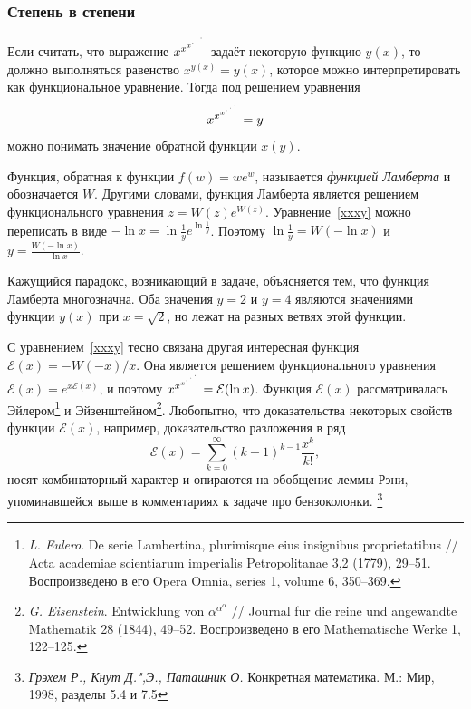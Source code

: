 \documentclass[twoside]{book}
\begin{document}
\subsubsection*{Степень в степени} %
Если считать, что выражение $x^{x^{ x^{{\cdot}^{\mkern2.5mu\cdot^{\mkern2.5mu\cdot}}}}}$ задаёт некоторую функцию $y(x)$, то должно выполняться равенство $x^{y(x)}=y(x)$, которое можно интерпретировать как функциональное уравнение.
Тогда под решением уравнения 
\begin{equation}
\label{xxxy}
x^{x^{ x^{{\cdot}^{\mkern2.5mu\cdot^{\mkern2.5mu\cdot}}}}}=y
\end{equation}
можно понимать значение обратной функции $x(y).$

Функция,  обратная к функции $f(w)=we^w$, называется \emph{функцией Ламберта} и обозначается $W$.
Другими словами,  функция Ламберта является решением функционального уравнения $z=W(z)e^{W(z)}$.
Уравнение~\eqref{xxxy} можно переписать в виде $-\ln x=\ln\frac{1}{y }e^{\ln\frac{1}{y }}$.
Поэтому $\ln\frac{1}{y }=W(-\ln x)$
и
$y=\frac{W(-\ln x)}{ -\ln x}$.

Кажущийся парадокс, возникающий в задаче, объясняется тем, что  функция Ламберта многозначна.
Оба значения $y=2$ и $y=4$ являются значениями функции $y(x)$ при $x=\sqrt{2}$, но лежат на разных ветвях этой функции. 

С уравнением~\eqref{xxxy} тесно связана другая интересная функция
$\mathcal{E}(x)=-W(-x)/x$.
Она является решением функционального уравнения
$\mathcal{E}(x)=e^{x\mathcal{E}(x)}$, и поэтому $x^{x^{ x^{{\cdot}^{\mkern2.5mu\cdot^{\mkern2.5mu\cdot}}}}}=\mathcal{E}(\ln x)$.
Функция $\mathcal{E}(x)$ рассматривалась Эйлером\footnote{%
\emph{L. Eulero}. De serie Lambertina, plurimisque eius 
insignibus proprietatibus /\!/ Acta academiae scientiarum imperialis 
Petropolitanae 3,2 (1779), 29--51. Воспроизведено в его Opera 
Omnia, series 1, volume 6, 350--369.}
и Эйзенштейном\footnote{%
\emph{G. Eisenstein}. Entwicklung von $\alpha^{\alpha^{\alpha}}$ /\!/ Journal 
fur die reine und angewandte Mathematik 28 (1844), 49--52. 
Воспроизведено в его Mathematische Werke 1, 122--125.}. 
Любопытно, что доказательства некоторых свойств функции $\mathcal{E}(x)$, например, доказательство разложения в ряд
$$\mathcal{E}(x)=\sum_{k=0}^{\infty}(k+1)^{k-1}\frac{x^k}{ k!},$$
носят комбинаторный характер и опираются на обобщение леммы Рэни, упоминавшейся выше в комментариях к задаче про бензоколонки.%
\footnote{\emph{Грэхем Р., Кнут Д.",Э., Паташник О.} Конкретная математика. М.: Мир, 1998, разделы 5.4 и 7.5}
\end{document}
